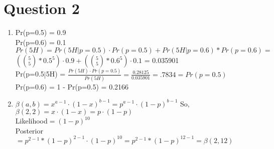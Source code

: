 \documentclass{article}
\begin{document}
\section*{Question 2}
\begin{enumerate}[label=\alph*)]
    \item Pr(p=0.5) = 0.9
        \\Pr(p=0.6) = 0.1
        \\$Pr(5H) = Pr(5H|p=0.5) \cdot Pr(p=0.5) + Pr(5H| p=0.6) * Pr(p=0.6)= $
        \\ $(\binom{5}{5}*0.5^5) \cdot 0.9 + (\binom{5}{5}*0.6^5) \cdot 0.1$ = 0.035901
        \\Pr(p=0.5$|$5H) = $\frac{Pr(5H) \cdot Pr(p=0.5)}{Pr(5H)} = \frac{0.28125}{ 0.035901} = .7834 = Pr(p=0.5)$
        \\Pr(p=0.6) = 1 - Pr(p=0.5) = 0.2166
    \item $\beta(a,b) = x^{a-1} \cdot (1-x)^{b-1} =  p^{a-1} \cdot (1-p)^{b-1}$ So,
    \\$\beta(2,2) = x \cdot (1-x) =  p \cdot (1-p)$
    \\$ $Likelihood$ = (1-p)^{10}$
    \\$ $Posterior$ = p^{2-1}*(1-p)^{2-1} \cdot (1-p)^{10} = p^{2-1}*(1-p)^{12-1} = \beta(2,12)$ 

\end{enumerate}
\end{document}
